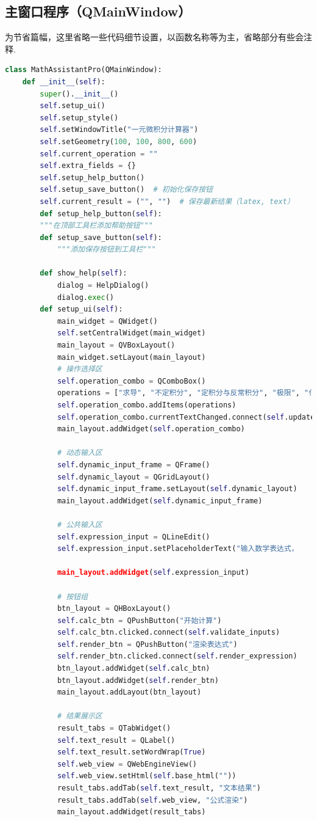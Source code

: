 \documentclass[UTF8,12pt]{ctexart}
\begin{document}
	\subsection{主窗口程序（QMainWindow）}
	为节省篇幅，这里省略一些代码细节设置，以函数名称等为主，省略部分有些会注释. 
	\begin{lstlisting}[language=Python]
class MathAssistantPro(QMainWindow):
	def __init__(self):
		super().__init__()
		self.setup_ui()
		self.setup_style()
		self.setWindowTitle("一元微积分计算器")
		self.setGeometry(100, 100, 800, 600)
		self.current_operation = ""
		self.extra_fields = {}
		self.setup_help_button()
		self.setup_save_button()  # 初始化保存按钮
		self.current_result = ("", "")  # 保存最新结果（latex, text）
		def setup_help_button(self):
		"""在顶部工具栏添加帮助按钮"""
		def setup_save_button(self):
			"""添加保存按钮到工具栏"""

		def show_help(self):
			dialog = HelpDialog()
			dialog.exec()
		def setup_ui(self):
			main_widget = QWidget()
			self.setCentralWidget(main_widget)
			main_layout = QVBoxLayout()
			main_widget.setLayout(main_layout)
			# 操作选择区
			self.operation_combo = QComboBox()
			operations = ["求导", "不定积分", "定积分与反常积分", "极限", "化简"]
			self.operation_combo.addItems(operations)
			self.operation_combo.currentTextChanged.connect(self.update_input_fields)
			main_layout.addWidget(self.operation_combo)
		
			# 动态输入区
			self.dynamic_input_frame = QFrame()
			self.dynamic_layout = QGridLayout()
			self.dynamic_input_frame.setLayout(self.dynamic_layout)
			main_layout.addWidget(self.dynamic_input_frame)
			
			# 公共输入区
			self.expression_input = QLineEdit()
			self.expression_input.setPlaceholderText("输入数学表达式，
																							例如：exp(x)*sin(x)")
			main_layout.addWidget(self.expression_input)
		
			# 按钮组
			btn_layout = QHBoxLayout()
			self.calc_btn = QPushButton("开始计算")
			self.calc_btn.clicked.connect(self.validate_inputs)
			self.render_btn = QPushButton("渲染表达式")
			self.render_btn.clicked.connect(self.render_expression)
			btn_layout.addWidget(self.calc_btn)
			btn_layout.addWidget(self.render_btn)
			main_layout.addLayout(btn_layout)
		
			# 结果展示区
			result_tabs = QTabWidget()
			self.text_result = QLabel()
			self.text_result.setWordWrap(True)
			self.web_view = QWebEngineView()
			self.web_view.setHtml(self.base_html(""))
			result_tabs.addTab(self.text_result, "文本结果")
			result_tabs.addTab(self.web_view, "公式渲染")
			main_layout.addWidget(result_tabs)
		

\end{lstlisting}
\end{document}

